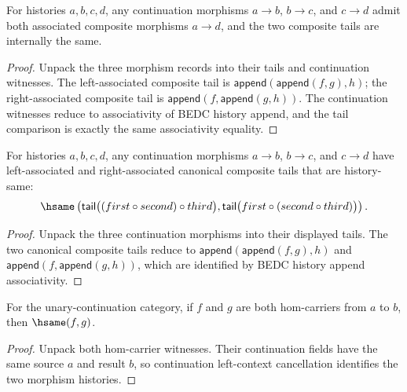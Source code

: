 \begin{theorem}
\label{thm:continuation-morphism-comp-assoc-closed}
For histories \(a,b,c,d\), any continuation morphisms
\(a\to b\), \(b\to c\), and \(c\to d\) admit both associated composite
morphisms \(a\to d\), and the two composite tails are internally the same.
\end{theorem}
\begin{proof}
Unpack the three morphism records into their tails and continuation witnesses.
The left-associated composite tail is \(\mathsf{append}(\mathsf{append}(f,g),h)\);
the right-associated composite tail is
\(\mathsf{append}(f,\mathsf{append}(g,h))\). The continuation witnesses reduce
to associativity of BEDC history append, and the tail comparison is exactly the
same associativity equality.
\end{proof}

\begin{theorem}
\label{thm:continuation-morphism-comp-assoc-tail-hsame}
For histories $a,b,c,d$, any continuation morphisms $a\to b$, $b\to c$, and
$c\to d$ have left-associated and right-associated canonical composite tails
that are history-same:
$$
\hsame
\left(
\mathsf{tail}\bigl((first\circ second)\circ third\bigr),
\mathsf{tail}\bigl(first\circ(second\circ third)\bigr)
\right).
$$
\end{theorem}
\begin{proof}
Unpack the three continuation morphisms into their displayed tails. The two
canonical composite tails reduce to
$\mathsf{append}(\mathsf{append}(f,g),h)$ and
$\mathsf{append}(f,\mathsf{append}(g,h))$, which are identified by BEDC history
append associativity.
\end{proof}

\begin{theorem}
\label{thm:category-hom-carrier-morphism-deterministic}
For the unary-continuation category, if \(f\) and \(g\) are both hom-carriers
from \(a\) to \(b\), then \(\hsame(f,g)\).
\end{theorem}
\begin{proof}
Unpack both hom-carrier witnesses. Their continuation fields have the same
source \(a\) and result \(b\), so continuation left-context cancellation
identifies the two morphism histories.
\end{proof}

